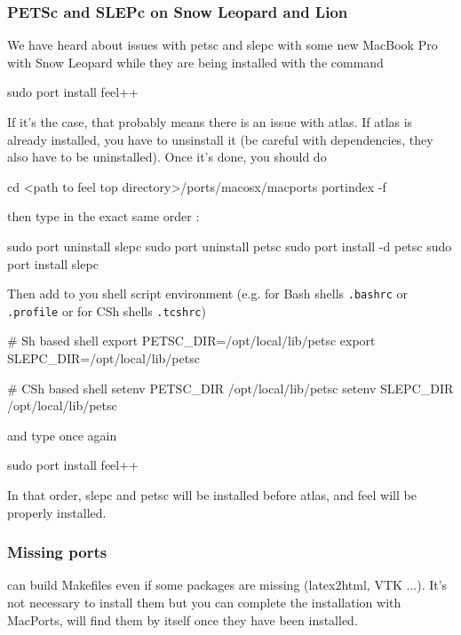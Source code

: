 \subsubsection{PETSc and SLEPc on Snow Leopard and Lion}
We have heard about issues with petsc and slepc with some new MacBook Pro with
Snow Leopard while they are being installed with the command
\begin{unixcom}
  sudo port install feel++
\end{unixcom}
If it's the case, that probably means there is an issue with
atlas. If atlas is already installed, you have to unsinstall it (be careful
with dependencies, they also have to be uninstalled). Once it's done, you should
do
\begin{unixcom}
		cd <path to feel top directory>/ports/macosx/macports
		portindex -f
\end{unixcom}

then type in the exact same order :
\begin{unixcom}
		sudo port uninstall slepc
		sudo port uninstall petsc
		sudo port install -d petsc
		sudo port install slepc
\end{unixcom}
Then add to you shell script environment (e.g. for Bash shells \lstinline|.bashrc| or
\lstinline|.profile| or for CSh shells \lstinline|.tcshrc|)
\begin{unixcom}
  # Sh based shell
  export PETSC_DIR=/opt/local/lib/petsc
  export SLEPC_DIR=/opt/local/lib/petsc

  # CSh based shell
  setenv PETSC_DIR /opt/local/lib/petsc
  setenv SLEPC_DIR /opt/local/lib/petsc
\end{unixcom}
and type once again
\begin{unixcom}
		sudo port install feel++
\end{unixcom}

\noindent In that order, slepc and petsc will be installed before atlas, and feel will be properly installed.

\subsubsection{Missing ports}
\cmake can build Makefiles even if some packages are missing (latex2html, VTK
...). It's not necessary to install them but you can complete the installation
with MacPorts, \cmake will find them by itself once they have been installed.

